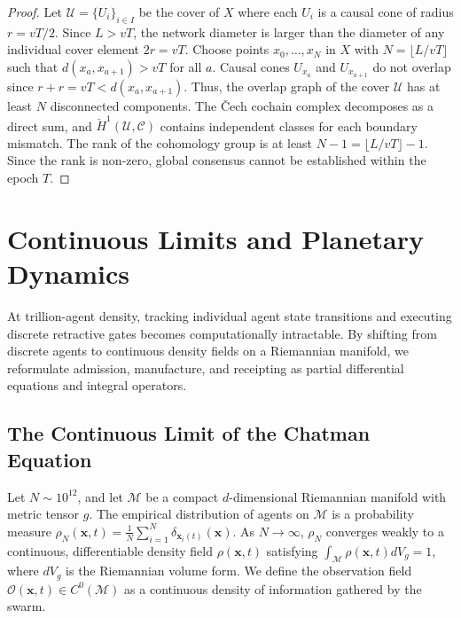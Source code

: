 \documentclass[11pt,oneside]{book}
\theoremstyle{definition}
\theoremstyle{plain}
\theoremstyle{remark}
\begin{document}
\begin{proof}
Let $\mathcal{U} = \{U_i\}_{i \in I}$ be the cover of $X$ where each $U_i$ is a causal cone of radius $r = v T / 2$. %
Since $L > v T$, the network diameter is larger than the diameter of any individual cover element $2r = v T$. %
Choose points $x_0, \dots, x_N$ in $X$ with $N = \lfloor L / v T \rfloor$ such that $d(x_a, x_{a+1}) > v T$ for all $a$. %
Causal cones $U_{x_a}$ and $U_{x_{a+1}}$ do not overlap since $r + r = v T < d(x_a, x_{a+1})$. %
Thus, the overlap graph of the cover $\mathcal{U}$ has at least $N$ disconnected components. %
The Čech cochain complex decomposes as a direct sum, and $\check{H}^1(\mathcal{U}, \mathcal{C})$ contains independent classes for each boundary mismatch. %
The rank of the cohomology group is at least $N - 1 = \lfloor L / v T \rfloor - 1$. %
Since the rank is non-zero, global consensus cannot be established within the epoch $T$. %
\end{proof}

\chapter{Continuous Limits and Planetary Dynamics}
\label{ch:continuous}

At trillion-agent density, tracking individual agent state transitions and executing discrete retractive gates becomes computationally intractable. %
By shifting from discrete agents to continuous density fields on a Riemannian manifold, we reformulate admission, manufacture, and receipting as partial differential equations and integral operators. %

\section{The Continuous Limit of the Chatman Equation}
Let $N \sim 10^{12}$, and let $\mathcal{M}$ be a compact $d$-dimensional Riemannian manifold with metric tensor $g$. %
The empirical distribution of agents on $\mathcal{M}$ is a probability measure $\rho_N(\mathbf{x}, t) = \frac{1}{N} \sum_{i=1}^N \delta_{\mathbf{x}_i(t)}(\mathbf{x})$. %
As $N \to \infty$, $\rho_N$ converges weakly to a continuous, differentiable density field $\rho(\mathbf{x}, t)$ satisfying $\int_{\mathcal{M}} \rho(\mathbf{x}, t) dV_g = 1$, where $dV_g$ is the Riemannian volume form. %
We define the observation field $\mathcal{O}(\mathbf{x}, t) \in C^0(\mathcal{M})$ as a continuous density of information gathered by the swarm. %
\end{document}
